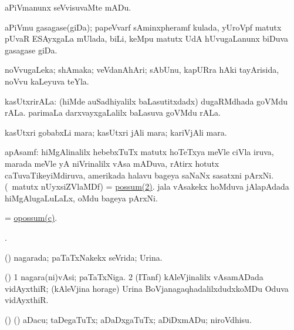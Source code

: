\bentry
{}
\gl{\sakirx}
\bmng
aPiVmanunx seVvisuvaMte mADu. 
\emng
\eentry

\bentry
{}
\gl{\nA}
\bmng
aPiVmu gasagase(giDa); papeVvarf sAminxpheramf kulada, yUroVpf matutx pUvaR ESAyxgaLa mUlada, biLi, keMpu matutx UdA hUvugaLanunx biDuva gasagase giDa. 
\emng
\eentry

\bentry
{}
\gl{\nA}
\bmng
noVvugaLeka; shAmaka; veVdanAhAri; sAbUnu, kapURra hAki tayArisida, noVvu kaLeyuva teYla. 
\emng
\eentry

\bentry
{}
\gl{\nA}
\bmng
kasUtxrirALa: 
\banum
{} (hiMde auSadhiyalilx baLasutitxdadx) dugaRMdhada goVMdu rALa. 
 parimaLa darxvayxgaLalilx baLasuva goVMdu rALa. 
\eanum
\emng
\eentry

\bentry
{}
\gl{\nA}
\bmng
kasUtxri gobabxLi mara; kasUtxri jAli mara; kariVjAli mara. 
\emng
\eentry

\bentry
{}
\gl{\nA}
\bmng
apAsamf: 
\banum
{} hiMgAlinalilx hebebxTuTx matutx hoTeTxya meVle ciVla iruva, marada meVle yA niVrinalilx vAsa mADuva, rAtirx hotutx caTuvaTikeyiMdiruva, amerikada halavu bageya saNaNx sasatxni pArxNi.  
 (\AseTxrXV\ matutx nUyxsiZVlaMDf) = \hyperref{kandict_p.pdf}{P}{possum(2)}{possum(2)}. 
\hypertarget{opossum(c)}{} 
 jala vAsakekx hoMduva jAlapAdada hiMgAlugaLuLaLx, oMdu bageya pArxNi. 
\eanum
\emng

\noindent
\gl{\pagu}
\bmng
{} = \hyperlink{opossum(c)}{opossum(c)}. 
\emng
\eentry

\bentry
{}
\gl{\saMkiSx}
\bmng
{}. 
\emng
\eentry

\bentry
{}
\gl{\gu}
\bmng
(\viparx) nagarada; paTaTxNakekx seVrida; Urina. 
\emng
\eentry

\bentry
{}
\gl{\nA}
\bmng
(\viparx) 
\bnum
\num{1} nagara(ni)vAsi; paTaTxNiga. 
\num{2} (ITanf) kAleVjinalilx vAsamADada vidAyxthiR; (kAleVjina horage) Urina BoVjanagaqhadalilxdudxkoMDu Oduva vidAyxthiR. 
\enum
\emng
\eentry

\bentry
{}
\gl{\sakirx}
\bmng
(\veYshA) (\pArxparx) aDacu; taDegaTuTx; aDaDxgaTuTx; aDiDxmADu; niroVdhisu. 
\emng
\eentry

